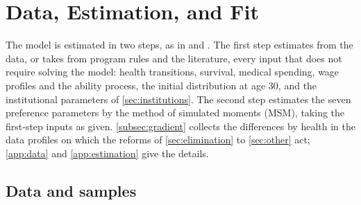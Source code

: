 \section{Data, Estimation, and Fit}\label{sec:estimation}

The model is estimated in two steps, as in \citet{Cagetti2003} and \citet{Gourinchas2002}. %
The first step estimates from the data, or takes from program rules and the literature, every input that does not require solving the model: health transitions, survival, medical spending, wage profiles and the ability process, the initial distribution at age 30, and the institutional parameters of \autoref{sec:institutions}. The second step estimates the seven preference parameters by the method of simulated moments (MSM), taking the first-step inputs as given. %
\autoref{subsec:gradient} collects the differences by health in the data profiles on which the reforms of \autoref{sec:elimination} to \autoref{sec:other} act; \autoref{app:data} and \autoref{app:estimation} give the details.

\subsection{Data and samples}\label{subsec:data}

